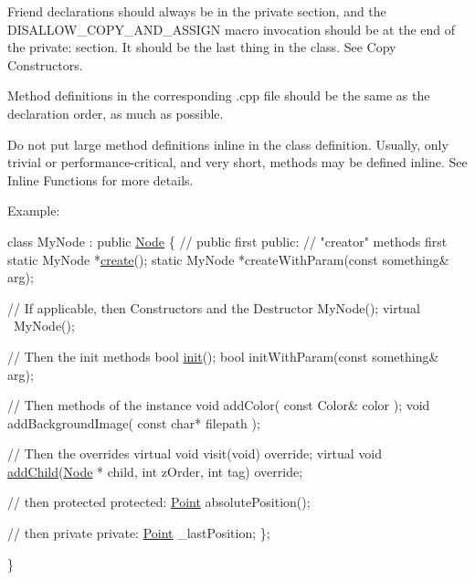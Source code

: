 Friend declarations should always be in the private section, and the {\ttfamily D\+I\+S\+A\+L\+L\+O\+W\+\_\+\+C\+O\+P\+Y\+\_\+\+A\+N\+D\+\_\+\+A\+S\+S\+I\+GN} macro invocation should be at the end of the private\+: section. It should be the last thing in the class. See Copy Constructors.

Method definitions in the corresponding .cpp file should be the same as the declaration order, as much as possible.

Do not put large method definitions inline in the class definition. Usually, only trivial or performance-\/critical, and very short, methods may be defined inline. See Inline Functions for more details.

Example\+: 
\begin{DoxyCode}
\textcolor{keyword}{class }MyNode : \textcolor{keyword}{public} \hyperlink{classNode}{Node}
\{
\textcolor{comment}{// public first}
\textcolor{keyword}{public}:
    \textcolor{comment}{// "creator" methods first}
    \textcolor{keyword}{static} MyNode *\hyperlink{classNode_aa9a92a1756b585d707a42c3fd1b274d4}{create}();
    \textcolor{keyword}{static} MyNode *createWithParam(\textcolor{keyword}{const} something& arg);

    \textcolor{comment}{// If applicable, then Constructors and the Destructor    }
    MyNode();
    \textcolor{keyword}{virtual} ~MyNode();

    \textcolor{comment}{// Then the init methods}
    \textcolor{keywordtype}{bool} \hyperlink{namespaceDrawPrimitives_ae042e1546ce595f9b01f92bcac0be48a}{init}();
    \textcolor{keywordtype}{bool} initWithParam(\textcolor{keyword}{const} something& arg);


    \textcolor{comment}{// Then methods of the instance}
    \textcolor{keywordtype}{void} addColor( \textcolor{keyword}{const} Color& color );
    \textcolor{keywordtype}{void} addBackgroundImage( \textcolor{keyword}{const} \textcolor{keywordtype}{char}* filepath );

    \textcolor{comment}{// Then the overrides}
    \textcolor{keyword}{virtual} \textcolor{keywordtype}{void} visit(\textcolor{keywordtype}{void}) \textcolor{keyword}{override};
    \textcolor{keyword}{virtual} \textcolor{keywordtype}{void} \hyperlink{classNode_a132699398b350e83b548a5645e69beb0}{addChild}(\hyperlink{classNode}{Node} * child, \textcolor{keywordtype}{int} zOrder, \textcolor{keywordtype}{int} tag) \textcolor{keyword}{override};

\textcolor{comment}{// then protected}
\textcolor{keyword}{protected}:
    \hyperlink{classVec2}{Point} absolutePosition();

\textcolor{comment}{// then private}
\textcolor{keyword}{private}:
    \hyperlink{classVec2}{Point}    \_lastPosition;
\};

\}
\end{DoxyCode}


